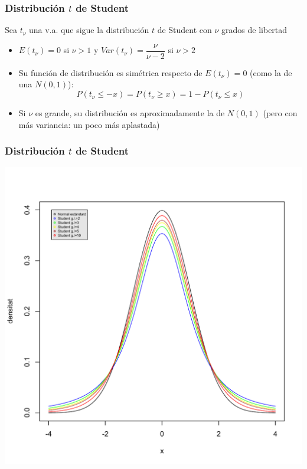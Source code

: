 \documentclass[12pt,t]{beamer}\usepackage[]{graphicx}\usepackage[]{color}
\renewcommand{\leq}{\leqslant}
\renewcommand{\geq}{\geqslant}
\theoremstyle{plain}
\theoremstyle{definition}
\begin{document}
\begin{frame}
\frametitle{Distribución $t$ de Student}

Sea $t_{\nu}$ una v.a. que sigue la distribución $t$ de
Student con $\nu$ grados de libertad
\medskip

\begin{itemize}
\item $E(t_{\nu})=0$  si $\nu>1$ y $Var(t_{\nu})=\dfrac{\nu}{\nu-2}$ si $\nu>2$
\medskip

\item Su  función de distribución es simétrica respecto de $E(t_{\nu})=0$ (como la de una $N(0,1)$):
$$
P(t_{\nu}\leq -x)=P(t_{\nu}\geq x)=1-P(t_{\nu}\leq x)
$$

\item Si $\nu$ es grande, su distribución es aproximadamente la de $N(0,1)$ (pero con más variancia: un poco más aplastada)
\end{itemize}

\end{frame}

\begin{frame}
\frametitle{Distribución $t$ de Student}
\vspace*{-1cm}

\includegraphics[width=0.95\linewidth]{tstud-div.pdf}
\end{frame}
\end{document}
